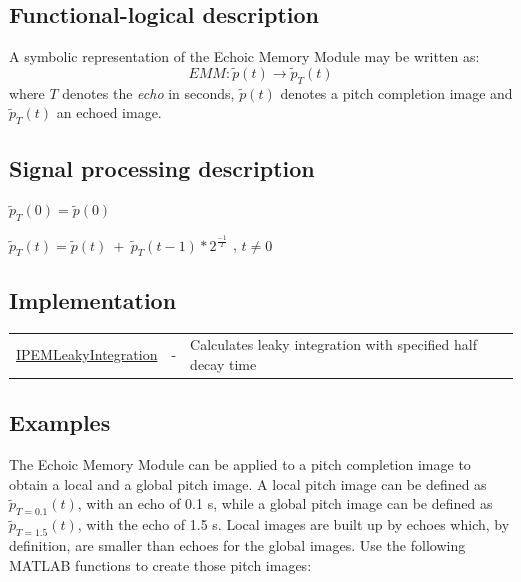 \subsection{Functional-logical description}

A symbolic representation of the Echoic Memory Module may be written as:
\begin{equation}
EMM: \tilde{p}(t) \rightarrow \tilde{p}_T(t)
\end{equation}
where $T$ denotes the {\sl echo} in seconds, $\tilde{p}(t)$
denotes a pitch completion image and $ \tilde{p}_T(t)$ an echoed
image.


\subsection{Signal processing description}

$\tilde{p}_T(0) = \tilde{p}(0)$

$\tilde{p}_T(t) = \tilde{p}(t) ~+~
\tilde{p}_T(t-1)*2^{\frac{-1}{T}}$ \quad , $t \neq 0$


\subsection{Implementation}

\begin{tabularx}{\linewidth}{llX}
\hyperlink{FuncRef:IPEMLeakyIntegration}{IPEMLeakyIntegration} & - & Calculates leaky integration with specified half decay time\\
\end{tabularx}


\subsection{Examples}

The Echoic Memory Module can be applied to a pitch completion
image to obtain a local and a global pitch image. A local pitch
image can be defined as $\tilde{p}_{T=0.1}(t)$, with an echo of
0.1 s, while a global pitch image can be defined as
$\tilde{p}_{T=1.5}(t)$, with the echo of 1.5 s. Local images are
built up by echoes which, by definition, are smaller than echoes
for the global images. Use the following MATLAB functions to
create those pitch images:\\

